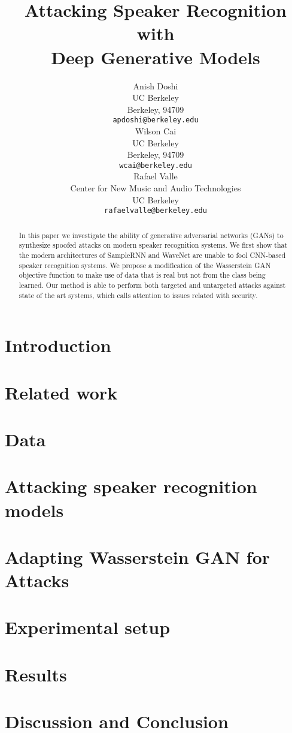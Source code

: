 \documentclass{article}
\title{Attacking Speaker Recognition with \\Deep Generative Models}
\author{
  Anish Doshi \\
  UC Berkeley \\
  Berkeley, 94709 \\
  \texttt{apdoshi@berkeley.edu} \\
  \And
  Wilson Cai\\
  UC Berkeley\\
  Berkeley, 94709 \\
  \texttt{wcai@berkeley.edu} \\
  \And
  Rafael Valle \\
  Center for New Music and Audio Technologies \\
  UC Berkeley\\
  \texttt{rafaelvalle@berkeley.edu} \\
}
\begin{document}

\maketitle

\begin{abstract}
    In this paper we investigate the ability of generative adversarial networks (GANs) to synthesize spoofed attacks on modern speaker recognition systems. We first show that the modern architectures of SampleRNN 
    and WaveNet are unable to fool CNN-based speaker recognition systems. We propose  
    a modification of the Wasserstein GAN objective function to make use of data that is 
    real but not from the class being learned. Our method is able to perform both targeted and untargeted attacks against state of the art systems, which calls attention to issues related with security. 
\end{abstract}

\theoremseparator{:}
\newtheorem{hyp}{Hypothesis}

\section{Introduction} \label{sec:introduction}

%
\section{Related work}\label{sec:related_work}

%
\section{Data}\label{sec:data}

%
\section{Attacking speaker recognition models}\label{sec:spk_rec_atks}

%
\section{Adapting Wasserstein GAN for Attacks}\label{sec:wgan}

%
\section{Experimental setup}\label{sec:experiments}

%
\section{Results}\label{sec:results}

%
\section{Discussion and Conclusion}\label{sec:conclusions}

%



\end{document}
